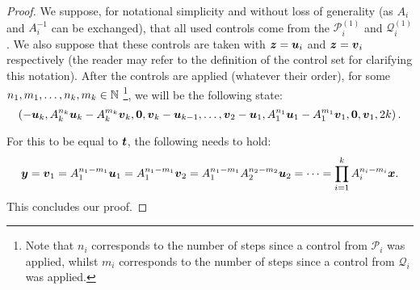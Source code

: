 \begin{proof}
We suppose, for notational simplicity and without loss of generality (as $A_{i}$ and $A_{i}^{-1}$ can be exchanged),
that all used controls come from the $\mathcal{P}_{i}^{(1)}$ and $\mathcal{Q}_{i}^{(1)}$.
We also suppose that these controls are taken with $\boldsymbol{z}=\boldsymbol{u}_{i}$ and $\boldsymbol{z}=\boldsymbol{v}_{i}$ respectively
(the reader may refer to the definition of the control set for clarifying this notation).
After the controls are applied (whatever their order), for some $n_{1}, m_{1}, \ldots, n_{k}, m_{k} \in \mathbb{N}$
\footnote{Note that $n_{i}$ corresponds to the number of steps since a control from $\mathcal{P}_{i}$ was applied, whilst $m_{i}$ corresponds to the number of steps since a control from $\mathcal{Q}_{i}$ was applied.},
we will be the following state:
\begin{equation*}
  \left(
  -\boldsymbol{u}_{k}, A_{k}^{n_{k}} \boldsymbol{u}_{k} - A_{k}^{m_{k}} \boldsymbol{v}_{k}, \boldsymbol{0}, \boldsymbol{v}_{k} - \boldsymbol{u}_{k-1},
  \ldots,
  \boldsymbol{v}_{2} - \boldsymbol{u}_{1}, A_{1}^{n_{1}} \boldsymbol{u}_{1} - A_{1}^{m_{1}} \boldsymbol{v}_{1}, \boldsymbol{0}, \boldsymbol{v}_{1},
  2k
  \right).
\end{equation*}

For this to be equal to $\boldsymbol{t}$, the following needs to hold:
\begin{equation*}
  \boldsymbol{y} = \boldsymbol{v}_{1} = A_{1}^{n_{1} - m_{1}} \boldsymbol{u}_{1} = A_{1}^{n_{1} - m_{1}} \boldsymbol{v}_{2} =
  A_{1}^{n_{1} - m_{1}} A_{2}^{n_{2} - m_{2}} \boldsymbol{u}_{2} = \cdots = \prod\limits_{i=1}^{k} A_{i}^{n_{i} - m_{i}} \boldsymbol{x}.
\end{equation*}
This concludes our proof.
\end{proof}
